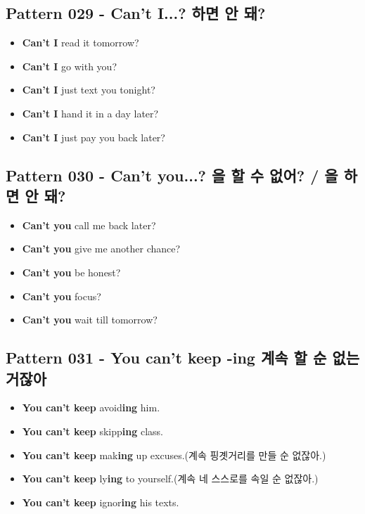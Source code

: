 \documentclass[11pt]{oblivoir}
\begin{document}
\subsection{Pattern 029 - Can't I...? \texttildelow 하면 안 돼?}
\begin{itemize}
  \item \textbf{Can't I} read it tomorrow?
  \item \textbf{Can't I} go with you?
  \item \textbf{Can't I} just text you tonight?
  \item \textbf{Can't I} hand it in a day later?
  \item \textbf{Can't I} just pay you back later?
\end{itemize}

\subsection{Pattern 030 - Can't you...? \texttildelow 을 할 수 없어? / \texttildelow 을 하면 안 돼?}
\begin{itemize}
  \item \textbf{Can't you} call me back later?
  \item \textbf{Can't you} give me another chance?
  \item \textbf{Can't you} be honest?
  \item \textbf{Can't you} focus?
  \item \textbf{Can't you} wait till tomorrow?
\end{itemize}

\subsection{Pattern 031 - You can't keep -ing 계속 \texttildelow 할 순 없는 거잖아}
\begin{itemize}
  \item \textbf{You can't keep} avoid\textbf{ing} him.
  \item \textbf{You can't keep} skipp\textbf{ing} class.
  \item \textbf{You can't keep} mak\textbf{ing} up excuses.(계속 핑곗거리를 만들 순 없잖아.)
  \item \textbf{You can't keep} ly\textbf{ing} to yourself.(계속 네 스스로를 속일 순 없잖아.)
  \item \textbf{You can't keep} ignor\textbf{ing} his texts.
\end{itemize}
\end{document}
